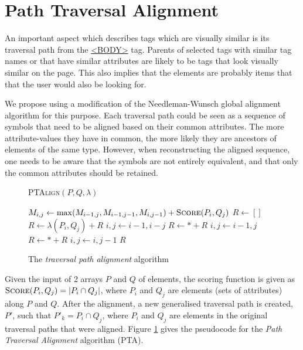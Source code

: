 \section{Path Traversal Alignment}
An important aspect which describes tags which are visually similar is its traversal path from
the \url{<BODY>} tag. Parents of selected tags with similar tag names or that have similar
attributes are likely to be tags that look visually similar on the page. This also implies that
 the elements are probably items that that the user would also be looking for.

We propose using a modification of the Needleman-Wunsch global alignment algorithm for this
purpose. Each traversal path could be seen as a sequence of symbols that need to be aligned
based on their common attributes. The more attribute-values they have in common, the more
likely they are ancestors of elements of the same type. However, when reconstructing the
aligned sequence, one needs to be aware that the symbols are not entirely equivalent, and that
only the common attributes should be retained. 

\begin{figure}[htbp]
\singlespacing
	\begin{algorithm}[H]
	\caption{\textsc{PTAlign}$(P,Q,\lambda)$}
	\begin{algorithmic}[1]
				\STATE $M_{i,j} \leftarrow \max(M_{i-1,j},M_{i-1,j-1},M_{i,j-1}) + \textsc{Score}(P_i,Q_j)$
			\ENDFOR	
		\ENDFOR
		\STATE $R \leftarrow []$
				\STATE $R \leftarrow \lambda(P_i,Q_j) + R$
				\STATE $i,j \leftarrow i-1,i-j$
				\STATE $R \leftarrow * + R$
				\STATE $i,j \leftarrow i-1,j$
				\STATE $R \leftarrow * + R$
				\STATE $i,j \leftarrow i,j-1$
	    	\ENDIF	
		\ENDWHILE
		\RETURN $R$
	\end{algorithmic}
	\end{algorithm}
\caption{The \textit{traversal path alignment} algorithm}
\label{fig:lcas}
\end{figure}

Given the input of 2 arrays $P$ and $Q$ of elements, the scoring function is given as
$\textsc{Score}(P_i,Q_j) = |P_i \cap Q_j|$, where $P_i$ and $Q_j$ are elements (sets of
attributes) along $P$ and $Q$. After the alignment, a new generalised traversal path is
created, $P'$, such that $P'_k = P_i \cap Q_j$, where $P_i$ and $Q_j$ are elements in the
original traversal paths that were aligned. Figure \ref{fig:lcas} gives the pseudocode for the
\textit{Path Traversal Alignment} algorithm (PTA).


